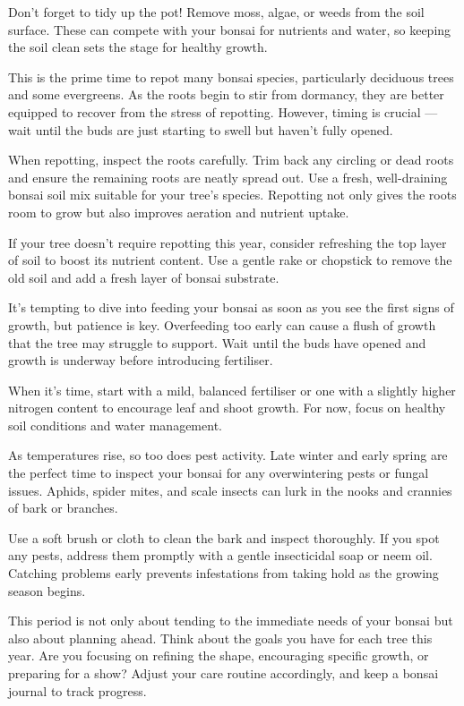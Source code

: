 Don't forget to tidy up the pot!
Remove moss, algae, or weeds from the soil surface.
These can compete with your bonsai for nutrients and water, so keeping the soil clean sets the stage for healthy growth.

\medskip
{}
\noindent
This is the prime time to repot many bonsai species, particularly deciduous trees and some evergreens.
As the roots begin to stir from dormancy, they are better equipped to recover from the stress of repotting.
However, timing is crucial --- wait until the buds are just starting to swell but haven't fully opened.

When repotting, inspect the roots carefully.
Trim back any circling or dead roots and ensure the remaining roots are neatly spread out.
Use a fresh, well\--draining bonsai soil mix suitable for your tree's species.
Repotting not only gives the roots room to grow but also improves aeration and nutrient uptake.

If your tree doesn't require repotting this year, consider refreshing the top layer of soil to boost its nutrient content.
Use a gentle rake or chopstick to remove the old soil and add a fresh layer of bonsai substrate.

\medskip
{}
\noindent
It's tempting to dive into feeding your bonsai as soon as you see the first signs of growth, but patience is key.
Overfeeding too early can cause a flush of growth that the tree may struggle to support.
Wait until the buds have opened and growth is underway before introducing fertiliser.

When it's time, start with a mild, balanced fertiliser or one with a slightly higher nitrogen content to encourage leaf and shoot growth.
For now, focus on healthy soil conditions and water management.

\medskip
{}
\noindent
As temperatures rise, so too does pest activity.
Late winter and early spring are the perfect time to inspect your bonsai for any overwintering pests or fungal issues.
Aphids, spider mites, and scale insects can lurk in the nooks and crannies of bark or branches.

Use a soft brush or cloth to clean the bark and inspect thoroughly.
If you spot any pests, address them promptly with a gentle insecticidal soap or neem oil.
Catching problems early prevents infestations from taking hold as the growing season begins.

\medskip
{}
\noindent
This period is not only about tending to the immediate needs of your bonsai but also about planning ahead.
Think about the goals you have for each tree this year.
Are you focusing on refining the shape, encouraging specific growth, or preparing for a show?
Adjust your care routine accordingly, and keep a bonsai journal to track progress.

